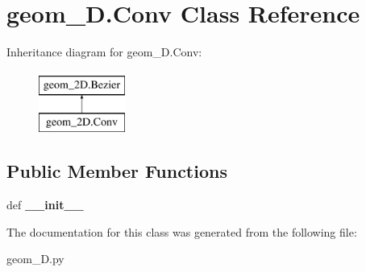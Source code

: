 \hypertarget{classgeom__2D_1_1Conv}{\section{geom\-\_\-D.\-Conv \-Class \-Reference}
\label{classgeom__2D_1_1Conv}
}
\-Inheritance diagram for geom\-\_\-D.\-Conv\-:\begin{figure}[H]
\begin{center}
\leavevmode
\includegraphics[height=2.000000cm]{classgeom__2D_1_1Conv}
\end{center}
\end{figure}
\subsection*{\-Public \-Member \-Functions}
\begin{DoxyCompactItemize}
\item 
\hypertarget{classgeom__2D_1_1Conv_aa021157b9808ed9ac5dbe72693697db4}{def {\bfseries \-\_\-\-\_\-init\-\_\-\-\_\-}}\label{classgeom__2D_1_1Conv_aa021157b9808ed9ac5dbe72693697db4}

\end{DoxyCompactItemize}


\-The documentation for this class was generated from the following file\-:\begin{DoxyCompactItemize}
\item 
geom\-\_\-D.\-py\end{DoxyCompactItemize}
